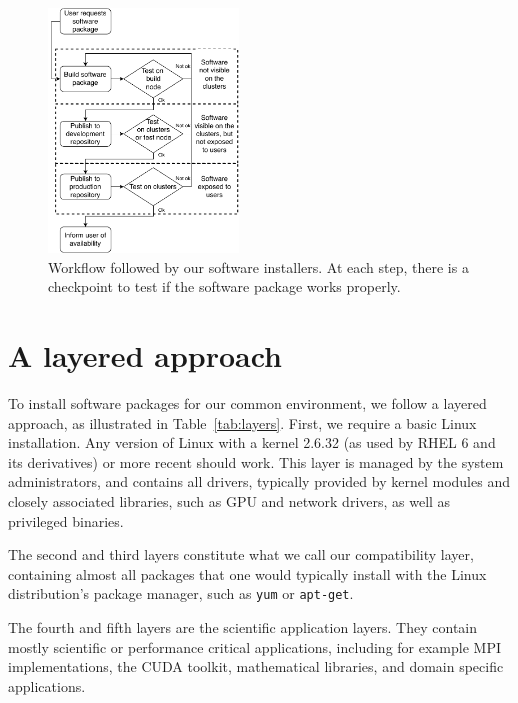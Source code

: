 \documentclass[sigconf]{acmart}
\begin{document}
\begin{figure}
  \includegraphics[width=0.45\textwidth]{Software-installation-workflow.pdf}
  \caption{Workflow followed by our software installers. At each step, there is a checkpoint to test if the software package works properly.}
  \label{fig:Workflow}
\end{figure}

\section{A layered approach}
\label{sec:Layered_environment}
To install software packages for our common environment, we follow a layered approach, as illustrated in Table~\ref{tab:layers}. First, we require a basic Linux installation. Any version of Linux with a kernel 2.6.32 (as used by RHEL 6 and its derivatives) or more recent should work. This layer is managed by the system administrators, and contains all drivers, typically provided by kernel modules and closely associated libraries, such as GPU and network drivers, as well as privileged binaries. 

The second and third layers constitute what we call our compatibility layer, containing almost all packages that one would typically install with the Linux distribution's package manager, such as \texttt{yum} or \texttt{apt-get}. 

The fourth and fifth layers are the scientific application layers. They contain mostly scientific or performance critical applications, including for example MPI implementations, the CUDA toolkit, mathematical libraries, and domain specific applications. 
\end{document}
